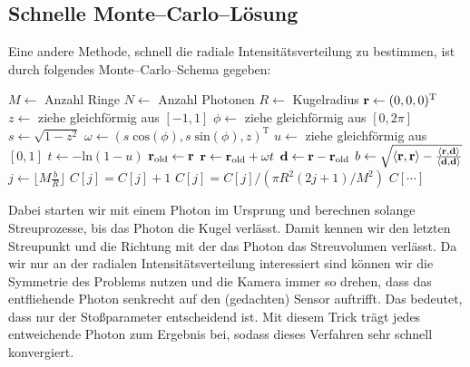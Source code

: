 	\subsection{Schnelle Monte--Carlo--Lösung}\label{subsec:homspherefastmcscheme}
	Eine andere Methode, schnell die radiale Intensitätsverteilung zu bestimmen, ist durch folgendes Monte--Carlo--Schema gegeben:
	\begin{algorithmic}
		\STATE $M\leftarrow$ Anzahl Ringe
		\STATE $N\leftarrow$ Anzahl Photonen
		\STATE $R\leftarrow$ Kugelradius
			\STATE $\mathbf{r}\leftarrow (0,0,0)^\text{T}$
			\REPEAT
				\STATE{}
				\STATE $z\leftarrow$ ziehe gleichförmig aus $[-1,1]$
				\STATE $\phi\leftarrow$ ziehe gleichförmig aus $[0,2\pi]$
				\STATE $s\leftarrow\sqrt{1-z^2}$
				\STATE $\omega\leftarrow (s\;\text{cos}(\phi),s\;\text{sin}(\phi),z)^\text{T}$
				\STATE{}
				\STATE $u\leftarrow$ ziehe gleichförmig aus $[0,1]$
				\STATE $t\leftarrow -\text{ln}(1-u)$
				\STATE $\mathbf{r}_\text{old}\leftarrow\mathbf{r}$
				\STATE $\mathbf{r}\leftarrow\mathbf{r}_\text{old}+\omega t$
			\STATE{}
			\STATE $\mathbf{d}\leftarrow\mathbf{r}-\mathbf{r}_\text{old}$
			\STATE $b\leftarrow\sqrt{\langle\mathbf{r},\mathbf{r}\rangle-\frac{\langle\mathbf{r},\mathbf{d}\rangle}{\langle\mathbf{d},\mathbf{d}\rangle}}$
			\STATE $j\leftarrow\lfloor M\frac{b}{R}\rfloor$
			\STATE $C[j]=C[j]+1$
		\ENDFOR
			\STATE $C[j]=C[j]/(\pi R^2(2j+1)/M^2)$
		\ENDFOR
		\RETURN $C[\cdots]$
	\end{algorithmic}
	Dabei starten wir mit einem Photon im Ursprung und berechnen solange Streuprozesse, bis das Photon die Kugel verlässt. Damit kennen wir den letzten Streupunkt und die Richtung mit der das Photon das Streuvolumen verlässt. Da wir nur an der radialen Intensitätsverteilung interessiert sind können wir die Symmetrie des Problems nutzen und die Kamera immer so drehen, dass das entfliehende Photon senkrecht auf den (gedachten) Sensor auftrifft. Das bedeutet, dass nur der Stoßparameter entscheidend ist. Mit diesem Trick trägt jedes entweichende Photon zum Ergebnis bei, sodass dieses Verfahren sehr schnell konvergiert.
	
	
